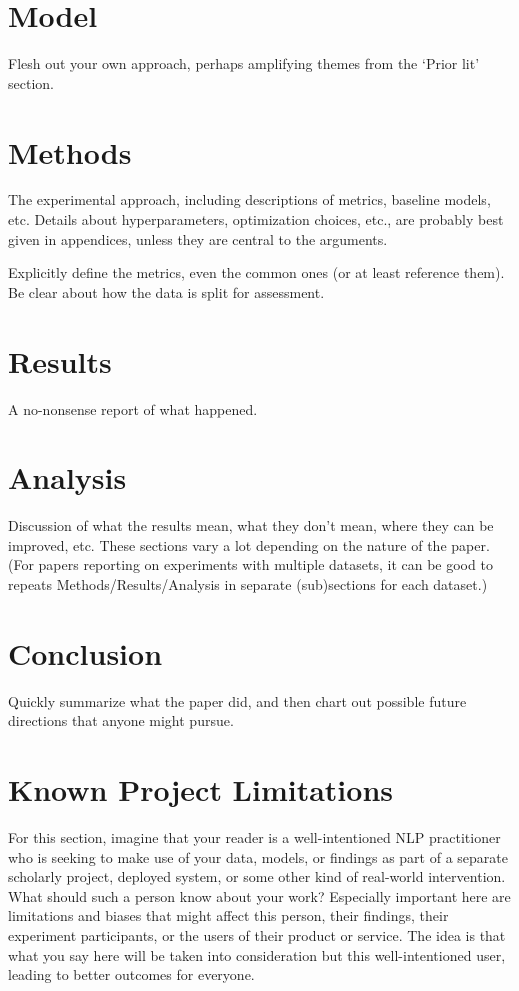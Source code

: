\documentclass[10pt]{article}
\begin{document}
\section{Model}

Flesh out your own approach, perhaps amplifying themes from the `Prior lit' section.

\section{Methods}

The experimental approach, including descriptions of metrics, baseline models, etc. Details about hyperparameters, optimization choices, etc., are probably best given in appendices, unless they are central to the arguments.

Explicitly define the metrics, even the common ones (or at least reference them). Be clear about how the data is split for assessment. 

\section{Results} 

A no-nonsense report of what happened.

\section{Analysis} 

Discussion of what the results mean, what they don’t mean, where they can be improved, etc. These sections vary a lot depending on the nature of the paper. (For papers reporting on experiments with multiple datasets, it can be good to repeats Methods/Results/Analysis in separate (sub)sections for each dataset.)

\section{Conclusion} 

Quickly summarize what the paper did, and then chart out possible future directions that anyone might pursue.

\section*{Known Project Limitations}

For this section, imagine that your reader is a well-intentioned NLP practitioner who is seeking to make use of your data, models, or findings as part of a separate scholarly project, deployed system, or some other kind of real-world intervention. What should such a person know about your work? Especially important here are limitations and biases that might affect this person, their findings, their experiment participants, or the users of their product or service. The idea is that what you say here will be taken into consideration but this well-intentioned user, leading to better outcomes for everyone.
\end{document}
